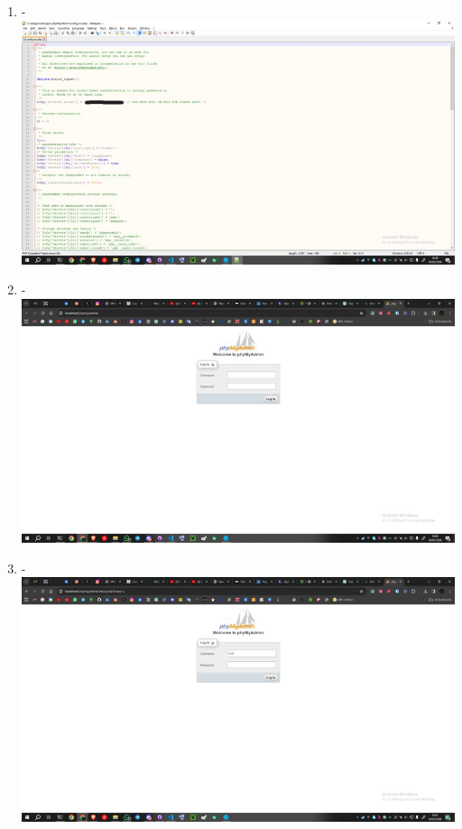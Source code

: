 \documentclass[12pt,titlepage]{article}
\begin{document}
\begin{enumerate}[label= \alph*.]
    \item - \\ \includegraphics[width=.9\textwidth]{images/figures/PHPMyAdmin 4.jpg}
    \newpage
    \item - \\ \includegraphics[width=.9\textwidth]{images/figures/PHPMyAdmin 5.jpg}
    \item - \\ \includegraphics[width=.9\textwidth]{images/figures/PHPMyAdmin 6.jpg}
\end{enumerate}

\newpage
\end{document}
